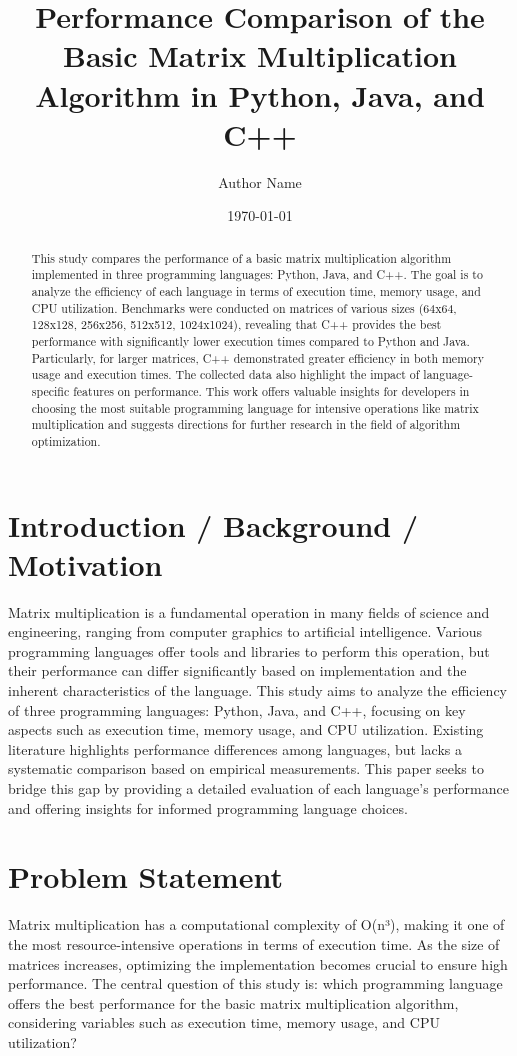 \documentclass{article}
\title{Performance Comparison of the Basic Matrix Multiplication Algorithm in Python, Java, and C++}
\author{Author Name}
\date{\today}
\begin{document}
\maketitle

\begin{abstract}
This study compares the performance of a basic matrix multiplication algorithm implemented in three programming languages: Python, Java, and C++. The goal is to analyze the efficiency of each language in terms of execution time, memory usage, and CPU utilization. Benchmarks were conducted on matrices of various sizes (64x64, 128x128, 256x256, 512x512, 1024x1024), revealing that C++ provides the best performance with significantly lower execution times compared to Python and Java. Particularly, for larger matrices, C++ demonstrated greater efficiency in both memory usage and execution times. The collected data also highlight the impact of language-specific features on performance. This work offers valuable insights for developers in choosing the most suitable programming language for intensive operations like matrix multiplication and suggests directions for further research in the field of algorithm optimization.
\end{abstract}

\section{Introduction / Background / Motivation}
Matrix multiplication is a fundamental operation in many fields of science and engineering, ranging from computer graphics to artificial intelligence. Various programming languages offer tools and libraries to perform this operation, but their performance can differ significantly based on implementation and the inherent characteristics of the language. This study aims to analyze the efficiency of three programming languages: Python, Java, and C++, focusing on key aspects such as execution time, memory usage, and CPU utilization. Existing literature highlights performance differences among languages, but lacks a systematic comparison based on empirical measurements. This paper seeks to bridge this gap by providing a detailed evaluation of each language's performance and offering insights for informed programming language choices.

\section{Problem Statement}
Matrix multiplication has a computational complexity of O(n³), making it one of the most resource-intensive operations in terms of execution time. As the size of matrices increases, optimizing the implementation becomes crucial to ensure high performance. The central question of this study is: which programming language offers the best performance for the basic matrix multiplication algorithm, considering variables such as execution time, memory usage, and CPU utilization?
\end{document}
